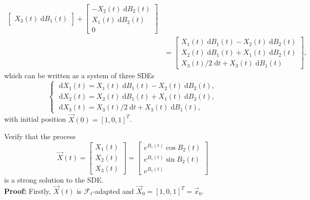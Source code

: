 \documentclass{MFM-hw} %
\newcommand{\filtration}{\mathcal{F}_t}
\newcommand{\dd}{\;\mathrm{d}}
\begin{document}
\begin{align*}
\begin{bmatrix}
        X_3(t) \dd B_1(t)
    \end{bmatrix}
    +
    \begin{bmatrix}
        -X_2(t) \dd B_2(t)\\
        X_1(t) \dd B_2(t)\\
        0
    \end{bmatrix}\\
    &=
    \begin{bmatrix}
        X_1(t) \dd B_1(t) -X_2(t) \dd B_2(t)\\
        X_2(t) \dd B_1(t)+X_1(t)\dd B_2(t)\\
        X_3(t)/2 \dd t + X_3(t)\dd B_1(t)
    \end{bmatrix},
 \end{align*}
which can be written as a system of three SDEs
\[
    \begin{cases}
        \dd X_1(t) = X_1(t) \dd B_1(t) -X_2(t) \dd B_2(t), \\
        \dd X_2(t) = X_2(t) \dd B_1(t)+X_1(t)\dd B_2(t), \\
        \dd X_3(t) = X_3(t)/2 \dd t + X_3(t)\dd B_1(t),
    \end{cases}
\]
with initial position $\vec{X}(0) = [1,0,1]^{T}$.

\HWsubproblem
Verify that the process
\[
 \vec{X}(t) = 
 \begin{bmatrix}
     X_1(t) \\
     X_2(t) \\
     X_3(t) 
 \end{bmatrix}
 =
 \begin{bmatrix}
     e^{B_1(t)} \cos B_2(t) \\
     e^{B_1(t)} \sin B_2(t) \\
     e^{B_1(t)}
 \end{bmatrix}
\]
is a strong solution to the SDE.\\

\textbf{Proof: }Firstly, $\vec{X}(t)$ is $\filtration$-adapted and $\vec{X}_0 = [1,0,1]^{T} = \vec{x}_0$.
\end{document}
